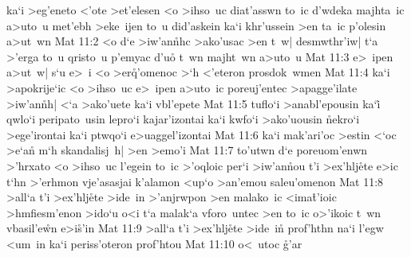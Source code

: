 ka`i
>eg'eneto
<'ote
>et'elesen
<o
>ihso~uc
diat'asswn
to~ic
d'wdeka
majhta~ic
a>uto~u
met'ebh
>eke~ijen
to~u
did'askein
ka`i
khr'ussein
>en
ta~ic
p'olesin
a>ut~wn\bibvsend
\vs Mat 11:2
<o
d`e
>iw'an\r{n}hc
>ako'usac
>en
t~w|
desmwthr'iw|
t`a
>'erga
to~u
qristo~u
p'emyac
d'u\r{o}
t~wn
majht~wn
a>uto~u\bibvsend
\vs Mat 11:3
e>~ipen
a>ut~w|
s`u
e>~i
<o
>er\r{q}'omenoc
>`h
<'eteron
prosdok~wmen\bibvsend
\vs Mat 11:4
ka`i
>apokrije`ic
<o
>ihso~uc
e>~ipen
a>uto~ic
poreuj'entec
>apagge'ilate
>iw'an\r{n}h|
<`a
>ako'uete
ka`i
vbl'epete\bibvsend
\vs Mat 11:5
tuflo`i
>anabl'epousin
ka`i\r{}
qwlo`i
peripato~usin
lepro`i
kajar'izontai
ka`i
kwfo`i
>ako'uousin
\r{n}ekro`i
>ege'irontai
ka`i
ptwqo`i
e>uaggel'izontai\bibvsend
\vs Mat 11:6
ka`i
mak'ari'oc
>estin
<`oc
>e`a\r{n}
m`h
skandalisj~h|
>en
>emo'i\bibvsend
\vs Mat 11:7
to'utwn
d`e
poreuom'enwn
>'hrxato
<o
>ihso~uc
l'egein
to~ic
>'oqloic
per`i
>iw'an\r{n}ou
t'i
>ex'hlj\r{e}te
e>ic
t`hn
>'erhmon
vje'asasjai
k'alamon
<up`o
>an'emou
saleu'omenon\bibvsend
\vs Mat 11:8
>all`a
t'i
>ex'hlj\r{e}te
>ide~in
>'anjrwpon
>en
malako~ic
<ima\r{t}'ioic
>hmfiesm'enon
>ido`u
o<i
t`a
malak`a
vforo~untec
>en
to~ic
o>'ikoic
t~wn
vbasil'e\r{w}n
e>i\r{s}'in\bibvsend
{}
\vs Mat 11:9
>all`a
t'i
>ex'hlj\r{e}te
>ide~in\r{}
prof'hthn
na`i
l'egw
<um~in
ka`i
periss'oteron
prof'htou\bibvsend
\vs Mat 11:10
o<~utoc
\r{g}'ar
